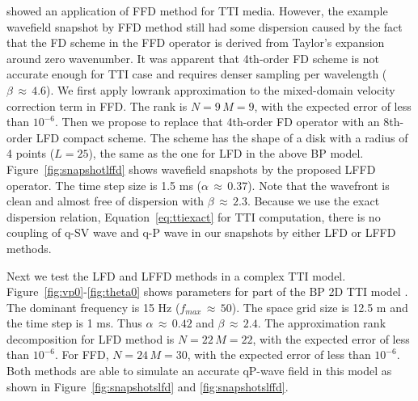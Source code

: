 
\cite{songx} showed an application of FFD method for TTI media. 
However, the example wavefield snapshot by FFD method still had some dispersion
caused by the fact that the FD scheme in the FFD operator is derived from Taylor's expansion around zero wavenumber. 
It was apparent that 4th-order FD scheme is not accurate enough for TTI case
and requires denser sampling per wavelength ($\beta\,\approx\,4.6$).
We first apply lowrank approximation
to the mixed-domain velocity correction term in FFD.
The rank  is $N=9\, M=9$, with the expected error of
less than $10^{-6}$.
Then we propose to replace that 4th-order FD operator with an 8th-order LFD compact scheme. 
The scheme has the shape of a disk with a radius of 4 points ($L=25$), the same as the one for LFD in the above BP model.
Figure~\ref{fig:snapshotlffd} shows wavefield snapshots by the proposed LFFD operator. 
The time step size is 1.5 ms ($\alpha\,\approx\,0.37$).
Note that the wavefront is clean and almost free of dispersion with $\beta\,\approx\,2.3$.
Because we use the exact dispersion relation, Equation~\ref{eq:ttiexact} for TTI computation,
there is no coupling of q-SV wave and q-P wave \cite[]{grechkat,zhang2,duveneckt} in our snapshots by either LFD or LFFD methods. 


Next we test the LFD and LFFD methods in a complex TTI model.
Figure~\ref{fig:vp0}-\ref{fig:theta0} shows parameters for part of the BP 2D TTI model \cite[]{bptti}.
The dominant frequency is 15 Hz ($f_{max}\,\approx\,50$). 
The space grid size is 12.5 m and the time step is 1 ms.
Thus $\alpha\,\approx\,0.42$ and $\beta\,\approx\,2.4$. 
The approximation
rank decomposition for LFD method is $N=22\, M=22$, with the expected error of
less than $10^{-6}$. 
For FFD, $N=24\, M=30$, with the expected error of
less than $10^{-6}$.
Both methods are able to simulate an accurate qP-wave field in this model as shown in Figure~\ref{fig:snapshotslfd} and \ref{fig:snapshotslffd}.


